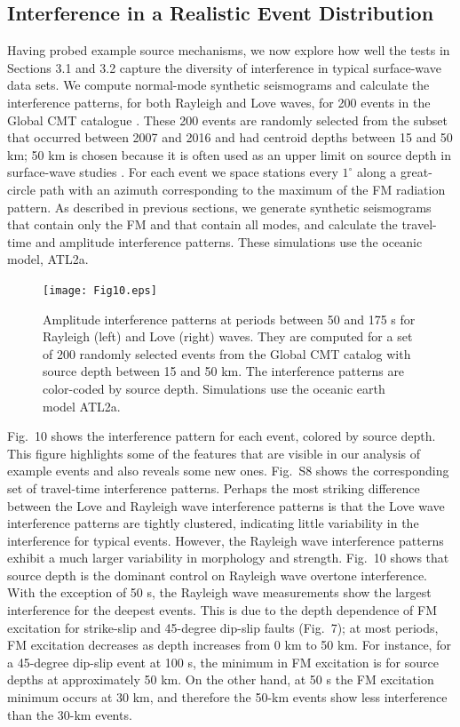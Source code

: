 \documentclass[extra,mreferee]{gji}
\begin{document}
\subsection{Interference in a Realistic Event Distribution}

Having probed example source mechanisms, we now explore how well the tests in Sections 3.1 and 3.2 capture the diversity of interference in typical surface-wave data sets. We compute normal-mode synthetic seismograms and calculate the interference patterns, for both Rayleigh and Love waves, for 200 events in the Global CMT catalogue \citep{dziewonski1981determination,ekstrom2012global}. These 200 events are randomly selected from the subset that occurred between 2007 and 2016 and had centroid depths between 15 and 50 km; 50 km is chosen because it is often used as an upper limit on source depth in surface-wave studies \citep{xbaoattenuationsurfacewaves, eddy2018age, babikoff2019long}. For each event we  space stations every $1^\circ$ along a great-circle path with an azimuth corresponding to the maximum of the FM radiation pattern. As described in previous sections, we generate synthetic seismograms that contain only the FM and that contain all modes, and calculate the travel-time and amplitude interference patterns. These simulations use the oceanic model, ATL2a.

\begin{figure}
 \texttt{[image: Fig10.eps]}
 \caption{Amplitude interference patterns at periods between 50 and 175 s for Rayleigh (left) and Love (right) waves. They are computed for a set of 200 randomly selected events from the Global CMT catalog with source depth between 15 and 50 km. The interference patterns are color-coded by source depth. Simulations use the oceanic earth model ATL2a.}
\end{figure}

Fig.\ 10 shows the interference pattern for each event, colored by source depth. This figure highlights some of the features that are visible in our analysis of example events and also reveals some new ones. Fig.\ S8 shows the corresponding set of travel-time interference patterns. Perhaps the most striking difference between the Love and Rayleigh wave interference patterns is that the Love wave interference patterns are tightly clustered, indicating little variability in the interference for typical events. However, the Rayleigh wave interference patterns exhibit a much larger variability in morphology and strength. Fig.\ 10 shows that source depth is the dominant control on Rayleigh wave overtone interference. With the exception of 50 s, the Rayleigh wave measurements show the largest interference for the deepest events. This is due to the depth dependence of FM excitation for strike-slip and 45-degree dip-slip faults (Fig.\ 7); at most periods, FM excitation decreases as depth increases from 0 km to 50 km. For instance, for a 45-degree dip-slip event at 100 s, the minimum in FM excitation is for source depths at approximately 50 km. On the other hand, at 50 s the FM excitation minimum occurs at 30 km, and therefore the 50-km events show less interference than the 30-km events. 
\end{document}
